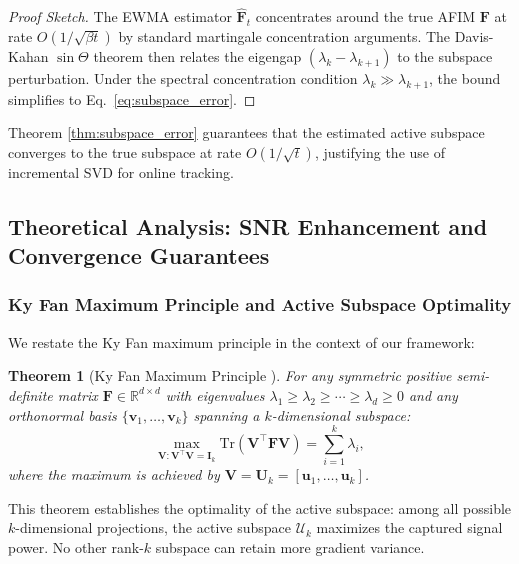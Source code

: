 ﻿\documentclass[lettersize,journal]{IEEEtran}
\newtheorem{theorem}{Theorem}
\begin{document}
\begin{proof}[Proof Sketch]
The EWMA estimator $\hat{\mathbf{F}}_t$ concentrates around the true AFIM $\mathbf{F}$ at rate $O(1/\sqrt{\beta t})$ by standard martingale concentration arguments. The Davis-Kahan $\sin \Theta$ theorem \cite{davis1970rotation} then relates the eigengap $(\lambda_k - \lambda_{k+1})$ to the subspace perturbation. Under the spectral concentration condition $\lambda_k \gg \lambda_{k+1}$, the bound simplifies to Eq.~\eqref{eq:subspace_error}.
\end{proof}

Theorem \ref{thm:subspace_error} guarantees that the estimated active subspace converges to the true subspace at rate $O(1/\sqrt{t})$, justifying the use of incremental SVD for online tracking.

\subsection{Theoretical Analysis: SNR Enhancement and Convergence Guarantees}
\label{sec:theory}

\subsubsection{Ky Fan Maximum Principle and Active Subspace Optimality}
\label{sec:ky_fan}

We restate the Ky Fan maximum principle \cite{fan1949theorem} in the context of our framework:

\begin{theorem}[Ky Fan Maximum Principle \cite{fan1949theorem}]
\label{thm:ky_fan}
For any symmetric positive semi-definite matrix $\mathbf{F} \in \mathbb{R}^{d \times d}$ with eigenvalues $\lambda_1 \geq \lambda_2 \geq \cdots \geq \lambda_d \geq 0$ and any orthonormal basis $\{\mathbf{v}_1, \ldots, \mathbf{v}_k\}$ spanning a $k$-dimensional subspace:
\begin{equation}
\label{eq:ky_fan}
\max_{\mathbf{V} : \mathbf{V}^\top \mathbf{V} = \mathbf{I}_k} \text{Tr}(\mathbf{V}^\top \mathbf{F} \mathbf{V}) = \sum_{i=1}^{k} \lambda_i,
\end{equation}
where the maximum is achieved by $\mathbf{V} = \mathbf{U}_k = [\mathbf{u}_1, \ldots, \mathbf{u}_k]$.
\end{theorem}

This theorem establishes the optimality of the active subspace: among all possible $k$-dimensional projections, the active subspace $\mathcal{U}_k$ maximizes the captured signal power. No other rank-$k$ subspace can retain more gradient variance.
\end{document}
